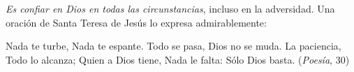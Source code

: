 	 \emph{Es confiar en Dios en todas las circunstancias}, incluso en la adversidad. Una oración de Santa Teresa de Jesús lo expresa admirablemente:
	
	\begin{cceprose}	
		Nada te turbe, Nada te espante.		
		Todo se pasa, Dios no se muda.		
		La paciencia, Todo lo alcanza;		
		Quien a Dios tiene, Nada le falta:		
		Sólo Dios basta. (\emph{Poesía}, 30)
	\end{cceprose}